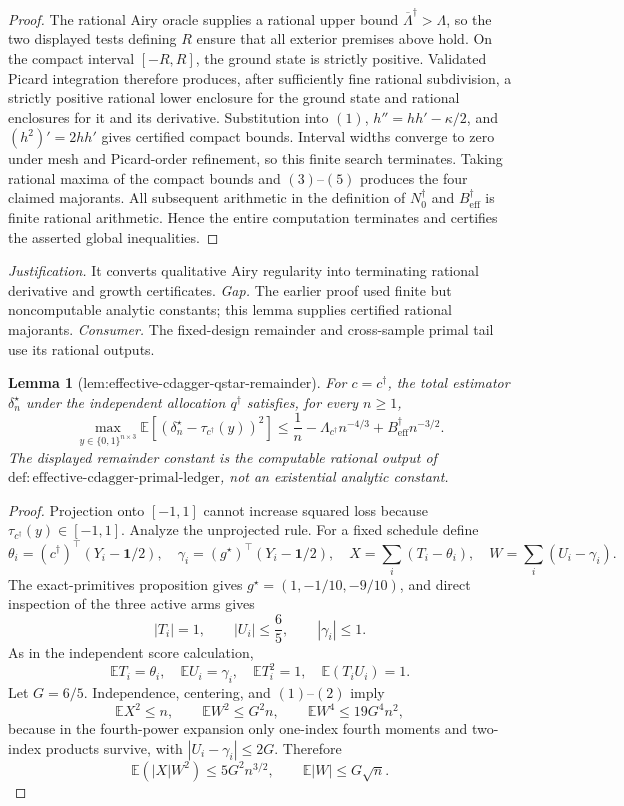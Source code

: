 \documentclass{article}
\newtheorem{lemma}{Lemma}
\begin{document}
{\begin{proof}
The rational Airy oracle supplies a rational upper bound
\(\overline\Lambda^\dagger>\Lambda\), so the two displayed tests defining \(R\) ensure that all exterior premises above hold.  On the compact interval \([-R,R]\), the ground state is strictly positive.  Validated Picard integration therefore produces, after sufficiently fine rational subdivision, a strictly positive rational lower enclosure for the ground state and rational enclosures for it and its derivative.  Substitution into \((1)\),
\(h''=hh'-\kappa/2\), and \((h^2)'=2hh'\) gives certified compact bounds.  Interval widths converge to zero under mesh and Picard-order refinement, so this finite search terminates.  Taking rational maxima of the compact bounds and \((3)\)--\((5)\) produces the four claimed majorants.  All subsequent arithmetic in the definition of \(N_0^\dagger\) and \(B_{\mathrm{eff}}^\dagger\) is finite rational arithmetic.  Hence the entire computation terminates and certifies the asserted global inequalities.
\end{proof}
\par\smallskip\noindent \textit{Justification.} It converts qualitative Airy regularity into terminating rational derivative and growth certificates. \textit{Gap.} The earlier proof used finite but noncomputable analytic constants; this lemma supplies certified rational majorants. \textit{Consumer.} The fixed-design remainder and cross-sample primal tail use its rational outputs.

\begin{lemma}[lem:effective-cdagger-qstar-remainder]\label{lem:effective-cdagger-qstar-remainder}
For \(c=c^\dagger\), the total estimator \(\delta_n^\star\) under the independent allocation \(q^\dagger\) satisfies, for every \(n\ge1\),
\[
\max_{y\in\{0,1\}^{n\times3}}
\mathbb E\left[(\delta_n^\star-\tau_{c^\dagger}(y))^2\right]
\le\frac1n-\Lambda_{c^\dagger}n^{-4/3}
+B_{\mathrm{eff}}^\dagger n^{-3/2}.
\]
The displayed remainder constant is the computable rational output of
\(\mathrm{def:effective\text{-}cdagger\text{-}primal\text{-}ledger}\), not an existential analytic constant.
\end{lemma}
\begin{proof}
Projection onto \([-1,1]\) cannot increase squared loss because
\(\tau_{c^\dagger}(y)\in[-1,1]\).  Analyze the unprojected rule.  For a fixed schedule define
\[
\theta_i=(c^\dagger)^\top(Y_i-\mathbf1/2),
\quad \gamma_i=(g^\star)^\top(Y_i-\mathbf1/2),
\quad X=\sum_i(T_i-\theta_i),
\quad W=\sum_i(U_i-\gamma_i).
\]
The exact-primitives proposition gives \(g^\star=(1,-1/10,-9/10)\), and direct inspection of the three active arms gives
\[
|T_i|=1,\qquad |U_i|\le\frac65,\qquad |\gamma_i|\le1.
\tag{1}
\]
As in the independent score calculation,
\[
\mathbb ET_i=\theta_i,\quad \mathbb EU_i=\gamma_i,\quad
\mathbb ET_i^2=1,\quad \mathbb E(T_iU_i)=1.
\tag{2}
\]
Let \(G=6/5\).  Independence, centering, and \((1)\)--\((2)\) imply
\[
\mathbb EX^2\le n,\qquad \mathbb EW^2\le G^2n,\qquad
\mathbb EW^4\le19G^4n^2,
\tag{3}
\]
because in the fourth-power expansion only one-index fourth moments and two-index products survive, with
\(|U_i-\gamma_i|\le2G\).  Therefore
\[
\mathbb E(|X|W^2)\le5G^2n^{3/2},\qquad
\mathbb E|W|\le G\sqrt n.
\tag{4}
\]


\end{proof}}
\end{document}
